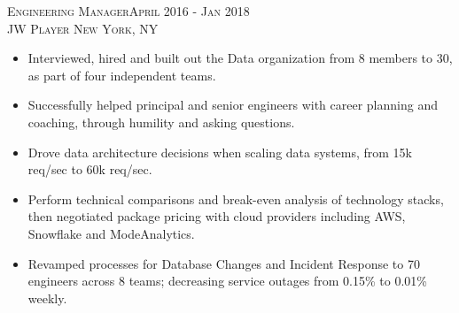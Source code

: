 \begin{comment}
  \textsc{Software Engineer \hfill February 2018 - October 2019\\}
  \textsc{Google \hfill New York, NY\\}
  \textsc{Tech-Lead of Android Advertising}
  \begin{itemize}
    \setlength{\itemsep}{1pt}
    \setlength{\parskip}{0pt}
    \setlength{\parsep}{0pt}
    \setlength{\leftmargin}{-5mm}
  \end{itemize}
\end{comment}

\textsc{Engineering Manager\hfill April 2016 - Jan 2018\\}
\textsc{JW Player \hfill New York, NY\\}
\begin{itemize}
	\setlength{\itemsep}{1pt}
	\setlength{\parskip}{0pt}
	\setlength{\parsep}{0pt}
	\setlength{\leftmargin}{-5mm}
	\item Interviewed, hired and built out the Data organization from 8 members to 30, as part of four independent teams.
	\item Successfully helped principal and senior engineers with career planning and coaching, through humility and asking questions.
	\item Drove data architecture decisions when scaling data systems, from 15k req/sec to 60k req/sec.
	\item Perform technical comparisons and break-even analysis of technology stacks, then negotiated package pricing with cloud providers including AWS, Snowflake and ModeAnalytics.
	\item Revamped processes for Database Changes and Incident Response to 70 engineers across 8 teams; decreasing service outages from 0.15\% to 0.01\% weekly.
\end{itemize}


